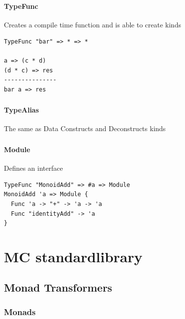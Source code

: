 \begin{frame}[fragile]
   \frametitle{\subsecname}
   \framesubtitle{TypeFunc}

   Creates a compile time function and is able to create kinds
   \begin{lstlisting}
TypeFunc "bar" => * => *

a => (c * d)
(d * c) => res
---------------
bar a => res
   \end{lstlisting}
\end{frame}

\begin{frame}[fragile]
   \frametitle{\subsecname}
   \framesubtitle{TypeAlias}

   The same as Data
   Constructs and Deconstructs kinds
\end{frame}

\begin{frame}[fragile]
   \frametitle{\subsecname}
   \framesubtitle{Module}

   Defines an interface
   \begin{lstlisting}
TypeFunc "MonoidAdd" => #a => Module
MonoidAdd 'a => Module {
  Func 'a -> "+" -> 'a -> 'a
  Func "identityAdd" -> 'a
}
   \end{lstlisting}
\end{frame}

\section{MC standardlibrary}
\subsection{Monad Transformers}
\subsubsection{Monads}

